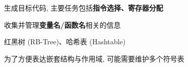 \begin{frame}{}
  \begin{center}

    \vspace{0.80cm}
  \end{center}
\end{frame}

\begin{frame}{}
  \begin{center}
     生成目标代码, 主要任务包括{\bf 指令选择、寄存器分配}

    \vspace{0.80cm}
  \end{center}
\end{frame}

\begin{frame}{}
  \begin{center}
     收集并管理{\bf 变量名/函数名}相关的信息
  \end{center}

\end{frame}

\begin{frame}{}

  \vspace{0.50cm}
  \begin{center}
    红黑树 (RB-Tree)、哈希表 (Hashtable)
  \end{center}
\end{frame}

\begin{frame}{}
  \begin{center}
    为了方便表达嵌套结构与作用域, 可能需要维护多个符号表
  \end{center}

\end{frame}

